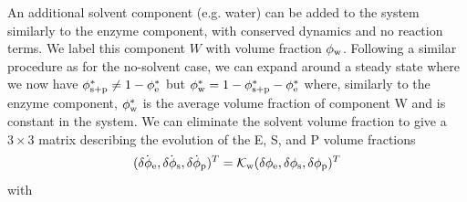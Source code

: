 An additional solvent component (e.g. water) can be added to the system similarly to the enzyme component, with conserved dynamics and no reaction terms. We label this component $W$ with volume fraction $\phi_{\mathrm{w}}$. Following a similar procedure as for the no-solvent case, we can expand around a steady state where we now have $\phi_{\mathrm{s+p}}^* \neq 1 - \phi_{\mathrm{e}}^*$ but $\phi_{\mathrm{w}}^* = 1 - \phi_{\mathrm{s+p}}^* - \phi_{\mathrm{e}}^*$ where, similarly to the enzyme component, $\phi_{\mathrm{w}}^*$ is the average volume fraction of component W and is constant in the system. We can eliminate the solvent volume fraction to give a $3\times3$ matrix describing the evolution of the E, S, and P volume fractions
\begin{equation}
    (\dot{\delta\phi_{\mathrm{e}}}, \dot{\delta\phi_{\mathrm{s}}}, \dot{\delta\phi_{\mathrm{p}}})^T = {\cal K}_{\rm w}(\delta\phi_{\mathrm{e}}, \delta\phi_{\mathrm{s}}, \delta\phi_{\mathrm{p}})^T    
\end{equation}
with
\newline
\noindent
{}

